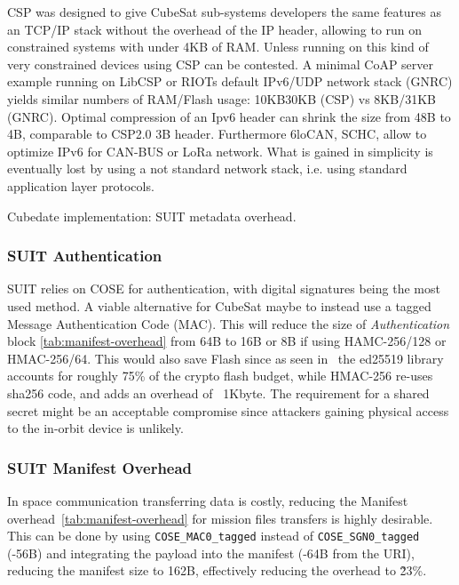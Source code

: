 CSP was designed to give CubeSat sub-systems developers the same features as an
TCP/IP stack without the overhead of the IP header, allowing to run on constrained
systems with under 4KB of RAM. Unless running on this kind of very constrained
devices using CSP can be contested. A minimal CoAP server example running on
LibCSP or RIOTs default IPv6/UDP network stack (GNRC) yields similar numbers of RAM/Flash
usage: 10KB\/30KB (CSP) vs 8KB/31KB (GNRC). Optimal compression of an Ipv6 header
can shrink the size from 48B to 4B, comparable to CSP2.0 3B header.
Furthermore  6loCAN\cite{wachter20206locan01}, SCHC\cite{rfc8724}, allow to
optimize IPv6 for CAN-BUS or LoRa network. What is gained in simplicity is eventually
lost by using a not standard network stack, i.e. using standard application
layer protocols.

\begin{table}[ht]

\begin{adjustbox}{width=0.5\columnwidth,center}
    \centering
    
\end{adjustbox}
\caption{Cubedate implementation: SUIT metadata overhead.}
\label{tab:manifest-overhead}
\end{table}

\subsubsection{SUIT Authentication}

SUIT relies on COSE for authentication, with digital signatures being the most
used method. A viable alternative for CubeSat maybe to instead use a tagged Message
Authentication Code (MAC). This will reduce the size of \textit{Authentication} block
\ref*{tab:manifest-overhead} from 64B to 16B or 8B if using HAMC-256/128
or HMAC-256/64. This would also save Flash since as seen in~\cite{zandberg2019secure}
the ed25519 library accounts for roughly 75\% of the crypto flash budget, while HMAC-256
re-uses sha256 code, and adds an overhead of ~1Kbyte. The requirement for a shared secret
might be an acceptable compromise since attackers gaining physical access to the
in-orbit device is unlikely.

\subsubsection{SUIT Manifest Overhead}

In space communication transferring data is costly, reducing the Manifest
overhead~\ref{tab:manifest-overhead} for mission files transfers is highly
desirable. This can be done by using \texttt{COSE\_MAC0\_tagged} instead of
\texttt{COSE\_SGN0\_tagged} (-56B) and integrating the payload into the
manifest (-64B from the URI), reducing the manifest size to 162B,
effectively reducing the overhead to \~23\%.

